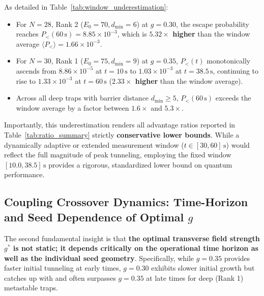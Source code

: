 As detailed in Table~\ref{tab:window_underestimation}:
\begin{itemize}
    \item For $N = 28$, Rank 2 ($E_0 = 70, d_{\min} = 6$) at $g = 0.30$, the escape probability reaches $P_<(60\,\text{s}) = 8.85 \times 10^{-3}$, which is \textbf{$5.32\times$ higher} than the window average $\langle P_< \rangle = 1.66 \times 10^{-3}$.
    \item For $N = 30$, Rank 1 ($E_0 = 75, d_{\min} = 9$) at $g = 0.35$, $P_<(t)$ monotonically ascends from $8.86 \times 10^{-5}$ at $t = 10\,\text{s}$ to $1.03 \times 10^{-3}$ at $t = 38.5\,\text{s}$, continuing to rise to $1.33 \times 10^{-3}$ at $t = 60\,\text{s}$ (\textbf{$2.33\times$ higher} than the window average).
    \item Across all deep traps with barrier distance $d_{\min} \ge 5$, $P_<(60\,\text{s})$ exceeds the window average by a factor between $1.6\times$ and $5.3\times$.
\end{itemize}

Importantly, this underestimation renders all advantage ratios reported in Table~\ref{tab:ratio_summary} strictly \textbf{conservative lower bounds}. While a dynamically adaptive or extended measurement window ($t \in [30, 60]\,\text{s}$) would reflect the full magnitude of peak tunneling, employing the fixed window $[10.0, 38.5]\,\text{s}$ provides a rigorous, standardized lower bound on quantum performance.

\subsection{Coupling Crossover Dynamics: Time-Horizon and Seed Dependence of Optimal $g$}
\label{subsec:coupling_crossover}

The second fundamental insight is that \textbf{the optimal transverse field strength $g^*$ is not static; it depends critically on the operational time horizon as well as the individual seed geometry}. Specifically, while $g = 0.35$ provides faster initial tunneling at early times, $g = 0.30$ exhibits slower initial growth but catches up with and often surpasses $g = 0.35$ at late times for deep (Rank 1) metastable traps.

